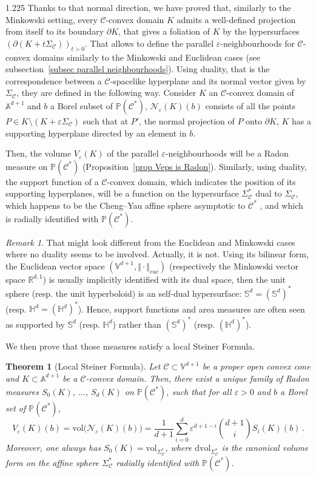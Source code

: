\documentclass[reqno, a4paper]{amsart}
\numberwithin{equation}{section}
\numberwithin{figure}{section}
\newtheorem{maintheorem}{Theorem}
\theoremstyle{definition}
\theoremstyle{remark}
\newtheorem{remark}[theorem]{Remark}
\newcommand{\R}{\mathbb{R}} %
\newcommand{\V}{\mathbb{V}} %
\newcommand{\A}{\mathbb{A}} %
\renewcommand{\P}{\mathbb{P}} %
\newcommand{\Sph}{\mathbb{S}} %
\renewcommand{\H}{\mathbb{H}} %
\newcommand{\dif}{\mathrm{d}} %
\newcommand{\C}{\mathcal{C}} %
\renewcommand{\S}{\Sigma_\C} %
\newcommand{\vol}{\mathrm{vol}} %
\newcommand{\dvol}{\dif \mathrm{vol}} %
\newcommand{\bp}[1]{{\bigl( {#1} \bigr)}} %
\begin{document}
\begin{spacing}{1.225}
Thanks to that normal direction,  we have proved \cite[Section 6]{Ablondi_25} that, similarly to the Minkowski setting, every $\C$-convex domain $K$ admits a well-defined projection from itself to its boundary $\partial K$,  that gives a foliation of $K$ by the hypersurfaces $(\partial(K+t\S))_{t>0}$. That allows to define the parallel $\varepsilon$-neighbourhoods for $\C$-convex domains similarly to the Minkowski and Euclidean cases (see subsection~\ref{subsec parallel neighbourhoods}). Using duality, that is the correspondence between a $\C$-spacelike hyperplane and its normal vector given by $\S$, they are defined in the following way. Consider $K$ an $\C$-convex domain of $\A^{d+1}$ and $b$ a Borel subset of $\P(\C^*)$, $\mathcal{N}_\varepsilon(K)(b)$ consists of all the points $P \in K\setminus(K+\varepsilon\S)$ such that at $P'$, the normal projection of $P$ onto $\partial K$, $K$ has a supporting hyperplane directed by an element in $b$. 

Then, the volume $V_\varepsilon(K)$ of the parallel $\varepsilon$-neighbourhoods will be a Radon measure on $\P(\C^*)$ (Proposition~\ref{prop Veps is Radon}). Similarly, using duality, the support function of a $\C$-convex domain, which indicates the position of its supporting hyperplanes, will be a function on the hypersurface $\S^*$ dual to $\S$, which happens to be the Cheng--Yau affine sphere asymptotic to $\C^*$ \cite{Gigena_81}, and which is radially identified with $\P(\C^*)$.

\begin{remark}
That might look different from the Euclidean and Minkowski cases where no duality seems to be involved. Actually, it is not. Using its bilinear form, the Euclidean vector space $(\V^{d+1}, \Vert \cdot \Vert_{euc})$ (respectively the Minkowski vector space $\R^{d,1}$) is usually implicitly identified with its dual space, then the unit sphere (resp. the unit hyperboloid) is an self-dual hypersurface:  $\Sph^{d} = (\Sph^{d})^*$ (resp. $\H^{d} = (\H^{d})^*$). Hence, support functions and area measures are often seen as supported by $\Sph^{d}$ (resp. $\H^{d}$) rather than $(\Sph^{d})^*$ (resp. $(\H^{d})^*$).
\end{remark} 

We then prove that those measures satisfy a local Steiner Formula. 

\begin{maintheorem}[Local Steiner Formula]
\label{theo intro Steiner}
Let $\C \subset \V^{d+1}$ be a proper open convex cone and $K \subset \A^{d+1}$ be a $\C$-convex domain. Then, there exist a unique family of Radon measures $S_0(K)$, $\dots$, $S_d(K)$ on $\P(\C^*)$, such that for all $\varepsilon>0$ and $b$ a Borel set of $\P(\C^*)$,
\begin{equation*}
V_\varepsilon(K)(b) = \vol\bp{\mathcal{N}_\varepsilon(K)(b)} = \frac{1}{d+1}\sum_{i=0}^{d}\varepsilon^{d+1-i} \binom{d+1}{i} S_i(K)(b) \, . 
\end{equation*}
Moreover, one always has $S_0(K) = \vol_{\S^*}$, where $\dvol_{\S^*}$ is the canonical volume form on the affine sphere $\S^*$ radially identified with $\P(\C^*)$.
\end{maintheorem}


\end{spacing}
\end{document}
